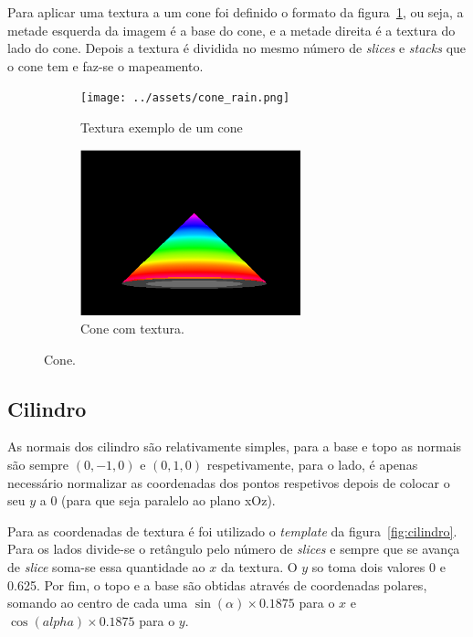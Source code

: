 \documentclass[a4paper]{article}
\begin{document}
Para aplicar uma textura a um cone foi definido o formato da
figura~\ref{fig:conetexture}, ou seja, a metade esquerda da imagem é a base do
cone, e a metade direita é a textura do lado do cone. Depois a textura é
dividida no mesmo número de \textit{slices} e \textit{stacks} que o cone tem e
faz-se o mapeamento.

\begin{figure}[H]
    \centering
    \begin{subfigure}{0.4\textwidth}
        \centering
        \texttt{[image: ../assets/cone\_rain.png]}
        \caption{Textura exemplo de um cone}
    \end{subfigure}
    \begin{subfigure}{0.4\textwidth}
        \centering
        \includegraphics[width=0.7\textwidth]{cone.png}
        \caption{Cone com textura.}
    \end{subfigure}
    \caption{Cone.}\label{fig:conetexture}
\end{figure}

\subsection{Cilindro}
As normais dos cilindro são relativamente simples, para a base e topo as
normais são sempre $(0,-1,0)$ e $(0,1,0)$ respetivamente, para o lado, é apenas
necessário normalizar as coordenadas dos pontos respetivos depois de colocar o
seu $y$ a 0 (para que seja paralelo ao plano xOz).

Para as coordenadas de textura é foi utilizado o \textit{template} da
figura~\ref{fig:cilindro}. Para os lados divide-se o retângulo pelo número de
\textit{slices} e sempre que se avança de \textit{slice} soma-se essa quantidade
ao $x$ da textura. O $y$ so toma dois valores 0 e 0.625. Por fim, o topo e a
base são obtidas através de coordenadas polares, somando ao centro de cada uma
$\sin(\alpha) \times 0.1875$ para o $x$ e $\cos(alpha) \times 0.1875$ para o $y$.
\end{document}
